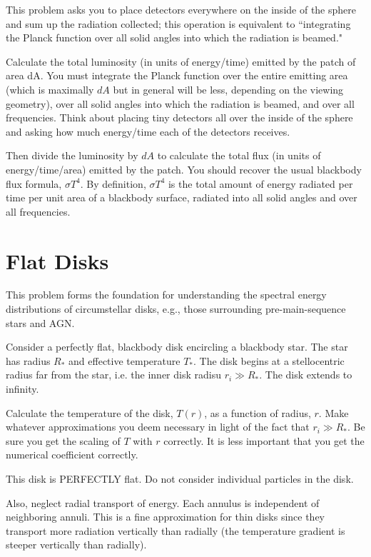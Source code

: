 \documentclass[11pt]{article}
\begin{document}
This problem asks you to place detectors everywhere on the inside of the sphere
and sum up the radiation collected; this operation is equivalent to
``integrating the Planck function over all solid angles into which the radiation
is beamed."

Calculate the total luminosity (in units of energy/time) emitted by the patch
of area dA. You must integrate the Planck function over the entire emitting
area (which is maximally $dA$ but in general will be less, depending on the
viewing geometry), over all solid angles into which the radiation is beamed,
and over all frequencies. Think about placing tiny detectors all over the
inside of the sphere and asking how much energy/time each of the detectors
receives.

Then divide the luminosity by $dA$ to calculate the total flux (in units of
energy/time/area) emitted by the patch. You should recover the usual blackbody
flux formula, $\sigma T^4$. By definition, $\sigma T^4$ is the total amount of
energy radiated per time per unit area of a blackbody surface, radiated into
all solid angles and over all frequencies.

\section{Flat Disks}

This problem forms the foundation for understanding the spectral energy distributions of
circumstellar disks, e.g., those surrounding pre-main-sequence stars and AGN.

Consider a perfectly flat, blackbody disk encircling a blackbody star. The star
has radius $R_*$ and effective temperature $T_*$. The disk begins at a stellocentric
radius far from the star, i.e. the inner disk radisu $r_i\gg R_*$.  
The disk extends to infinity.

Calculate the temperature of the disk, $T(r)$, as a function of radius, $r$. Make
whatever approximations you deem necessary in light of the fact that $r_i\gg R_*$. Be
sure you get the scaling of $T$ with $r$ correctly. It is less important that you
get the numerical coefficient correctly.

This disk is PERFECTLY flat. Do not consider individual particles in the disk.

Also, neglect radial transport of energy. Each annulus is independent of
neighboring annuli. This is a fine approximation for thin disks since they
transport more radiation vertically than radially (the temperature gradient is
steeper vertically than radially).
\end{document}
